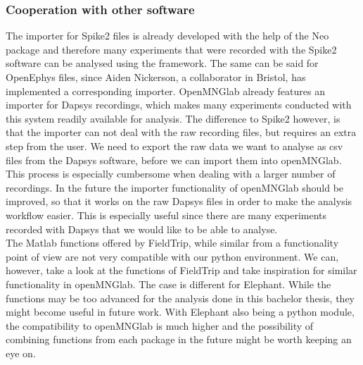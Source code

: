 \subsubsection{Cooperation with other software}
The importer for Spike2 files is already developed with the help of the Neo package and therefore many experiments that were recorded with the Spike2 software can be analysed using the framework. The same can be said for OpenEphys files, since Aiden Nickerson, a collaborator in Bristol, has implemented a corresponding importer.
OpenMNGlab already features an importer for Dapsys recordings, which makes many experiments conducted with this system readily available for analysis.
The difference to Spike2 however, is that the importer can not deal with the raw recording files, but requires an extra step from the user. We need to export the raw data we want to analyse as csv files from the Dapsys software, before we can import them into openMNGlab. This process is especially cumbersome when dealing with a larger number of recordings. In the future the importer functionality of openMNGlab should be improved, so that it works on the raw Dapsys files in order to make the analysis workflow easier. This is especially useful since there are many experiments recorded with Dapsys that we would like to be able to analyse.\\

The Matlab functions offered by FieldTrip, while similar from a functionality point of view are not very compatible with our python environment. We can, however, take a look at the functions of FieldTrip and take inspiration for similar functionality in openMNGlab.
The case is different for Elephant. While the functions may be too advanced for the analysis done in this bachelor thesis, they might become useful in future work.  With Elephant also being a python module, the compatibility to openMNGlab is much higher and the possibility of combining functions from each package in the future might be worth keeping an eye on. 

 
\cleardoublepage
